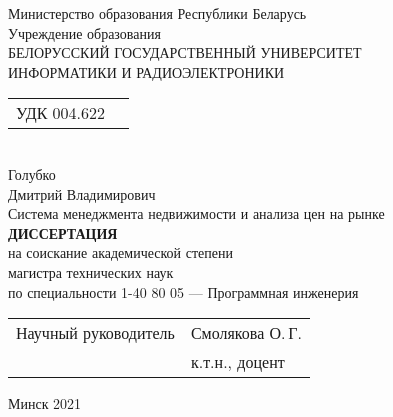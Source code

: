 \begin{titlepage}
  \begin{center}
    Министерство образования Республики Беларусь\\[1em]
    Учреждение образования\\
    БЕЛОРУССКИЙ ГОСУДАРСТВЕННЫЙ УНИВЕРСИТЕТ \\
    ИНФОРМАТИКИ И РАДИОЭЛЕКТРОНИКИ\\[3em]

    \begin{tabular}{ p{}p{} }
      УДК 004.622 & \\
    \end{tabular}\\[5em]


    {Голубко}\\
    {Дмитрий Владимирович}\\[1em]

    {Система менеджмента недвижимости и анализа цен на рынке}\\[5em]

    \textbf{ДИССЕРТАЦИЯ}\\
    {на соискание академической степени}\\
    {магистра технических наук}\\[1em]

    {по специальности 1-40 80 05 — Программная инженерия}\\[8em]

    \begin{tabular}{ p{}p{} }
      Научный руководитель & Смолякова О.\,Г. \\
       & к.т.н., доцент\\
    \end{tabular}
    
    \vfill
    {\normalsize Минск 2021}
  \end{center}
\end{titlepage}
